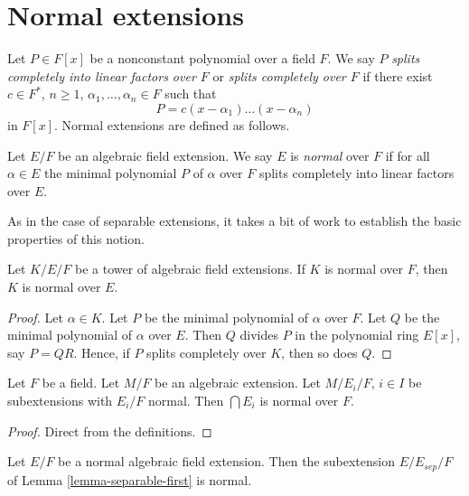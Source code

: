 \section{Normal extensions}
\label{section-normal}

\noindent
Let $P \in F[x]$ be a nonconstant polynomial over a field $F$. We say $P$
{\it splits completely into linear factors over $F$} or
{\it splits completely over $F$} if there exist
$c \in F^*$, $n \geq 1$, $\alpha_1, \ldots, \alpha_n \in F$ such that
$$
P = c(x - \alpha_1) \ldots (x - \alpha_n)
$$
in $F[x]$. Normal extensions are defined as follows.

\begin{definition}
\label{definition-normal}
Let $E/F$ be an algebraic field extension. We say $E$ is {\it normal}
over $F$ if for all $\alpha \in E$ the minimal polynomial $P$
of $\alpha$ over $F$ splits completely into linear factors over $E$.
\end{definition}

\noindent
As in the case of separable extensions, it takes a bit of work to establish
the basic properties of this notion.

\begin{lemma}
\label{lemma-normal-goes-up}
Let $K/E/F$ be a tower of algebraic field extensions.
If $K$ is normal over $F$, then $K$ is normal over $E$.
\end{lemma}

\begin{proof}
Let $\alpha \in K$. Let $P$ be the minimal polynomial of $\alpha$ over $F$.
Let $Q$ be the minimal polynomial of $\alpha$ over $E$.
Then $Q$ divides $P$ in the polynomial ring $E[x]$, say $P = QR$.
Hence, if $P$ splits completely over $K$, then so does $Q$.
\end{proof}

\begin{lemma}
\label{lemma-intersect-normal}
Let $F$ be a field. Let $M/F$ be an algebraic extension. Let
$M/E_i/F$, $i \in I$ be subextensions with
$E_i/F$ normal. Then $\bigcap E_i$ is normal over $F$.
\end{lemma}

\begin{proof}
Direct from the definitions.
\end{proof}

\begin{lemma}
\label{lemma-separable-first-normal}
Let $E/F$ be a normal algebraic field extension. Then the subextension
$E/E_{sep}/F$ of Lemma \ref{lemma-separable-first} is normal.
\end{lemma}

